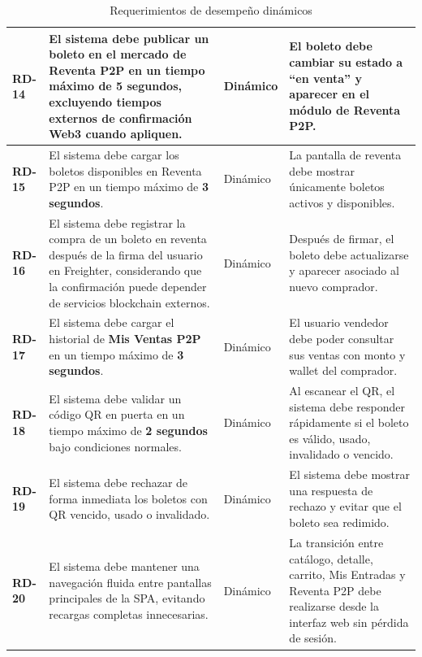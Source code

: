 \documentclass[12pt,letterpaper]{article}
\begin{document}
\begin{table}[H]
\begin{tabularx}{\textwidth}{|p{1.25cm}|X|p{1.4cm}|X|}
\textbf{RD-14} &
El sistema debe publicar un boleto en el mercado de Reventa P2P en un tiempo máximo de \textbf{5 segundos}, excluyendo tiempos externos de confirmación Web3 cuando apliquen. &
Dinámico &
El boleto debe cambiar su estado a ``en venta'' y aparecer en el módulo de Reventa P2P. \\ \hline

\textbf{RD-15} &
El sistema debe cargar los boletos disponibles en Reventa P2P en un tiempo máximo de \textbf{3 segundos}. &
Dinámico &
La pantalla de reventa debe mostrar únicamente boletos activos y disponibles. \\ \hline

\textbf{RD-16} &
El sistema debe registrar la compra de un boleto en reventa después de la firma del usuario en Freighter, considerando que la confirmación puede depender de servicios blockchain externos. &
Dinámico &
Después de firmar, el boleto debe actualizarse y aparecer asociado al nuevo comprador. \\ \hline

\textbf{RD-17} &
El sistema debe cargar el historial de \textbf{Mis Ventas P2P} en un tiempo máximo de \textbf{3 segundos}. &
Dinámico &
El usuario vendedor debe poder consultar sus ventas con monto y wallet del comprador. \\ \hline

\textbf{RD-18} &
El sistema debe validar un código QR en puerta en un tiempo máximo de \textbf{2 segundos} bajo condiciones normales. &
Dinámico &
Al escanear el QR, el sistema debe responder rápidamente si el boleto es válido, usado, invalidado o vencido. \\ \hline

\textbf{RD-19} &
El sistema debe rechazar de forma inmediata los boletos con QR vencido, usado o invalidado. &
Dinámico &
El sistema debe mostrar una respuesta de rechazo y evitar que el boleto sea redimido. \\ \hline

\textbf{RD-20} &
El sistema debe mantener una navegación fluida entre pantallas principales de la SPA, evitando recargas completas innecesarias. &
Dinámico &
La transición entre catálogo, detalle, carrito, Mis Entradas y Reventa P2P debe realizarse desde la interfaz web sin pérdida de sesión. \\ \hline

\end{tabularx}

\caption{Requerimientos de desempeño dinámicos}
\label{tab:requerimientos_desempeno_dinamicos}
\normalsize
\end{table}
\end{document}

